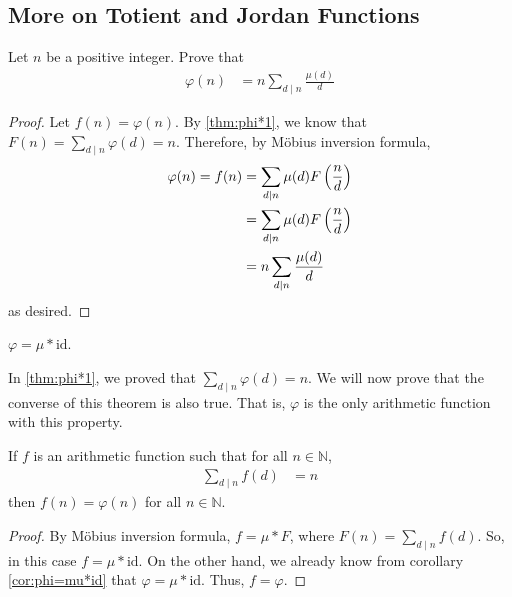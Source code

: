 \subsection{More on Totient and Jordan Functions}\label{sec:euler-jordan}
	\begin{theorem}  \label{thm:phi=n*sigma(mu/k)}
		Let $n$ be a positive integer. Prove that
		\begin{align*}
			\varphi(n)
				& = n\sum_{d\mid n} \frac{\mu(d)}{d}
		\end{align*}
	\end{theorem}

	\begin{proof}
		Let $f(n)=\varphi(n)$. By \autoref{thm:phi*1}, we know that $F(n)=\sum\limits_{d\mid n} \varphi(d)=n$. Therefore, by M\"{o}bius inversion formula,
			\begin{align*}
				\varphi(n) = f(n) &= \sum_{d\mid n}\mu(d)F\left(\frac nd\right)\\
						  &= \sum_{d\mid n}\mu(d)F\left(\frac nd\right)\\
						  &= n\sum_{d\mid n} \frac{\mu(d)}{d}
			\end{align*}
		as desired.
	\end{proof}


	\begin{corollary}\label{cor:phi=mu*id}
		$\varphi = \mu \ast \text{id}$.
	\end{corollary}

In \autoref{thm:phi*1}, we proved that $\sum\limits_{d\mid n} \varphi(d)=n$. We will now prove that the converse of this theorem is also true. That is, $\varphi$ is the only arithmetic function with this property.

	\begin{theorem} \label{thm:sumofphicon}
		If $f$ is an arithmetic function such that for all $n\in\mathbb{N} $,
			\begin{align*}
				\sum_{d\mid n}f(d) & = n
			\end{align*}
		then $f(n)=\varphi(n)$ for all $n\in\mathbb{N} $.
	\end{theorem}

	\begin{proof}
		By M\"{o}bius inversion formula, $f = \mu \ast F$, where $F(n)=\sum\limits_{d\mid n}f(d)$. So, in this case $f=\mu \ast \text{id}$. On the other hand, we already know from corollary \ref{cor:phi=mu*id} that $\varphi=\mu \ast \text{id}$. Thus, $f=\varphi$.
	\end{proof}


